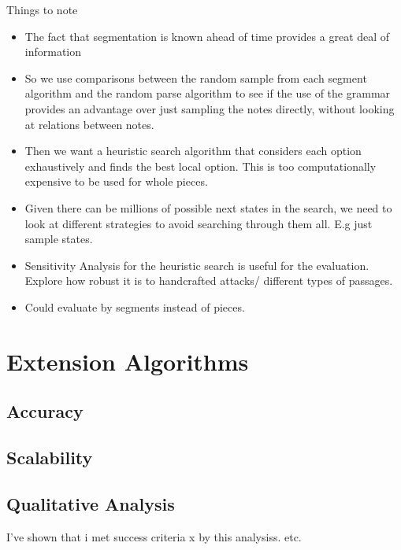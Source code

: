 \documentclass[12pt,a4paper,twoside,openright]{report}
\theoremstyle{definition}
\begin{document}
Things to note
\begin{itemize}
  \item The fact that segmentation is known ahead of time provides a great deal of information \cite{gothamWhatIfWhen2021}
  \item So we use comparisons between the random sample from each segment algorithm and the random parse algorithm to see if the use of the grammar provides an advantage over just sampling the notes directly, without looking at relations between notes.
  \item Then we want a heuristic search algorithm that considers each option exhaustively and finds the best local option. This is too computationally expensive to be used for whole pieces. 
  \item Given there can be millions of possible next states in the search, we need to look at different strategies to avoid searching through them all. E.g just sample states. 
  \item Sensitivity Analysis for the heuristic search is useful for the evaluation. Explore how robust it is to handcrafted attacks/ different types of passages.
  \item Could evaluate by segments instead of pieces. 
\end{itemize}

\section{Extension Algorithms}

\subsection{Accuracy}

\subsection{Scalability}

\subsection{Qualitative Analysis}


I've shown that i met success criteria x by this analysiss. etc.
\end{document}

